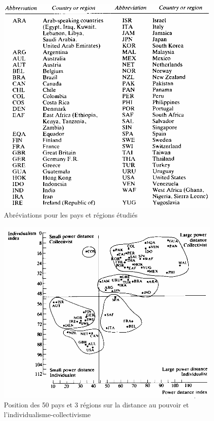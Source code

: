 \documentclass[12pt]{article}
\begin{document}
	  \begin{figure}[!ht]
	   \begin{center}
	    \includegraphics[width=0.65\linewidth]{hofstede_abbr.png}
	    \caption{Abréviations pour les pays et régions étudiés}
	   \end{center}
	  \end{figure}
	  
	  \begin{figure}[!ht]
	   \begin{center}
	    \includegraphics[width=0.65\linewidth]{hofstede_indivi_collect.png}
	    \caption{Position des 50 pays et 3 régions sur la distance au pouvoir et l'individualisme-collectivisme}
	   \end{center}
	  \end{figure}
	  
\end{document}
